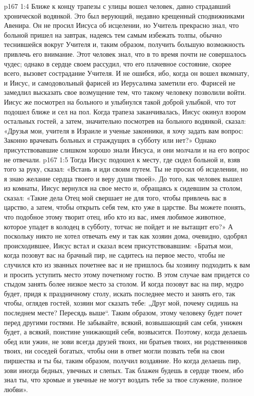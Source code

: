 \vs p167 1:4 Ближе к концу трапезы с улицы вошел человек, давно страдавший хронической водянкой. Это был верующий, недавно крещенный сподвижниками Авенира. Он не просил Иисуса об исцелении, но Учитель прекрасно знал, что больной пришел на завтрак, надеясь тем самым избежать толпы, обычно теснившейся вокруг Учителя и, таким образом, получить большую возможность привлечь его внимание. Этот человек знал, что в то время почти не совершалось чудес; однако в сердце своем рассудил, что его плачевное состояние, скорее всего, вызовет сострадание Учителя. И не ошибся, ибо, когда он вошел вкомнату, и Иисус, и самодовольный фарисей из Иерусалима заметили его. Фарисей не замедлил высказать свое возмущение тем, что такому человеку позволили войти. Иисус же посмотрел на больного и улыбнулся такой доброй улыбкой, что тот подошел ближе и сел на пол. Когда трапеза заканчивалась, Иисус окинул взором остальных гостей, а затем, значительно посмотрев на больного водянкой, сказал: «Друзья мои, учителя в Израиле и ученые законники, я хочу задать вам вопрос: Законно врачевать больных и страждущих в субботу или нет?» Однако присутствовавшие слишком хорошо знали Иисуса, и они молчали и на его вопрос не отвечали.
\vs p167 1:5 \pc Тогда Иисус подошел к месту, где сидел больной и, взяв того за руку, сказал: «Встань и иди своим путем. Ты не просил об исцелении, но я знаю желание сердца твоего и веру души твоей». До того, как человек вышел из комнаты, Иисус вернулся на свое место и, обращаясь к сидевшим за столом, сказал: «Такие дела Отец мой свершает не для того, чтобы привлечь вас в царство, а затем, чтобы открыть себя тем, кто уже в царстве. Вы можете понять, что подобное этому творит отец, ибо кто из вас, имея любимое животное, которое упадет в колодец в субботу, тотчас не пойдет и не вытащит его?» А поскольку никто не хотел отвечать ему и так как хозяин дома, очевидно, одобрял происходившее, Иисус встал и сказал всем присутствовавшим: «Братья мои, когда позовут вас на брачный пир, не садитесь на первое место, чтобы не случился кто из званных почетнее вас и не пришлось бы хозяину подходить к вам и просить уступить место этому почетному гостю. В этом случае вам придется со стыдом занять более низкое место за столом. И когда позовут вас на пир, мудро будет, придя к праздничному столу, искать последнее место и занять его, так чтобы, оглядев гостей, хозяин мог сказать тебе: „Друг мой, почему сидишь на последнем месте? Пересядь выше“. Таким образом, этому человеку будет почет перед другими гостями. Не забывайте, всякий, возвышающий сам себя, унижен будет, а всякий, поистине унижающий себя, возвысится. Поэтому, когда делаешь обед или ужин, не зови всегда друзей твоих, ни братьев твоих, ни родственников твоих, ни соседей богатых, чтобы они в ответ могли позвать тебя на свои пиршества и ты бы, таким образом, получил воздаяние. Но когда делаешь пир, зови иногда бедных, увечных и слепых. Так блажен будешь в сердце твоем, ибо знал ты, что хромые и увечные не могут воздать тебе за твое служение, полное любви».
